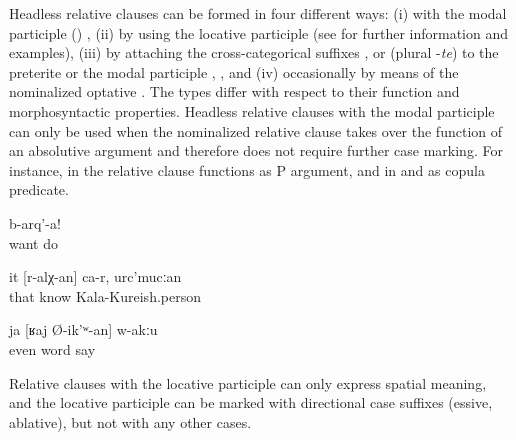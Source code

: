 Headless relative clauses can be formed in four different ways: (i) with the modal participle () , (ii) by using the locative participle (see  for further information and examples), (iii) by attaching the cross-categorical suffixes  ,  or  (plural -\textit{te}) to the preterite or the modal participle , , and (iv) occasionally by means of the nominalized optative . The types differ with respect to their function and morphosyntactic properties. Headless relative clauses with the modal participle can only be used when the nominalized relative clause takes over the function of an absolutive argument and therefore does not require further case marking. For instance, in  the relative clause functions as P argument, and in  and  as copula predicate. 
%
\begin{exe}
	\ex	\label{ex:Do what you want}
	\gll	[at	b-ikː-an]	b-arq'-a!\\
			want	do\\
	\glt	{}

	\ex	\label{ex:She is the one who I know, from Kala-Kureish}
	\gll	it	[r-alχ-an]	ca-r,	urc'mucːan\\
		that	know		Kala-Kureish.person\\
	\glt	{}

	\ex	\label{ex:There is even nobody who is talking.}
	\gll	ja	[ʁaj	Ø-ik'ʷ-an]	w-akːu\\
		even	word	say	\\
	\glt	{}
\end{exe}

Relative clauses with the locative participle can only express spatial meaning, and the locative participle can be marked with directional case suffixes (essive, ablative), but not with any other cases.

